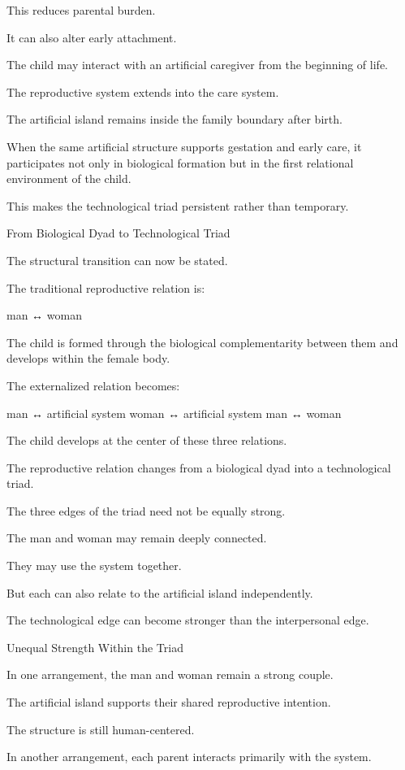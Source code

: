 This reduces parental burden.

It can also alter early attachment.

The child may interact with an artificial caregiver from the beginning of life.

The reproductive system extends into the care system.

The artificial island remains inside the family boundary after birth.

When the same artificial structure supports gestation and early care, it participates not only in biological formation but in the first relational environment of the child.

This makes the technological triad persistent rather than temporary.

From Biological Dyad to Technological Triad

The structural transition can now be stated.

The traditional reproductive relation is:

man ↔ woman

The child is formed through the biological complementarity between them and develops within the female body.

The externalized relation becomes:

man ↔ artificial system
woman ↔ artificial system
man ↔ woman

The child develops at the center of these three relations.

The reproductive relation changes from a biological dyad into a technological triad.

The three edges of the triad need not be equally strong.

The man and woman may remain deeply connected.

They may use the system together.

But each can also relate to the artificial island independently.

The technological edge can become stronger than the interpersonal edge.

Unequal Strength Within the Triad

In one arrangement, the man and woman remain a strong couple.

The artificial island supports their shared reproductive intention.

The structure is still human-centered.

In another arrangement, each parent interacts primarily with the system.

